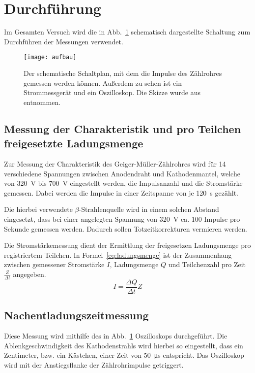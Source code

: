 
\newpage
\section{Durchführung}
%
Im Gesamten Versuch wird die in Abb.~\ref{fig:aufbau} schematisch 
dargestellte Schaltung zum Durchführen der Messungen verwendet.
%
\begin{figure}[h]
  \centering
  \texttt{[image: aufbau]}
  \caption{Der schematische Schaltplan, mit dem die Impulse
               des Zählrohres gemessen werden können. Außerdem zu sehen 
                ist ein Strommessgerät und ein Oszilloskop.
                 Die Skizze wurde aus \textcite{v703} entnommen.}
  \label{fig:aufbau}
\end{figure}
%
\subsection{Messung der Charakteristik und pro Teilchen freigesetzte Ladungsmenge}
%
Zur Messung der Charakteristik des Geiger-Müller-Zählrohres wird für 
\num{14} verschiedene Spannungen zwischen Anodendraht und 
Kathodenmantel, welche von \SI{320}{\volt} bis \SI{700}{\volt} 
eingestellt werden, die Impulsanzahl und die Stromstärke gemessen. 
Dabei werden die Impulse in einer Zeitspanne von je \SI{120}{\second} 
gezählt.

Die hierbei verwendete $\beta$-Strahlenquelle wird in einem solchen Abstand eingesetzt, 
dass bei einer angelegten Spannung von \SI{320}{\volt} ca. \num{100} Impulse pro 
Sekunde gemessen werden. Dadurch sollen Totzeitkorrekturen vermieren werden.

Die Stromstärkemessung dient der Ermittlung der freigesetzen 
Ladungsmenge pro registriertem Teilchen. In Formel~\eqref{eq:ladungsmenge} 
ist der Zusammenhang zwischen gemessener Stromstärke $I$, Ladungsmenge $Q$ 
und Teilchenzahl pro Zeit $\frac{Z}{\Delta t}$ angegeben.
\begin{equation}
I = \frac{\Delta Q}{\Delta t} Z
\label{eq:ladungsmenge}
\end{equation}
%
\subsection{Nachentladungszeitmessung}
%
Diese Messung wird mithilfe des in Abb.~\ref{fig:aufbau} Oszilloskops 
durchgeführt. Die Ablenkgeschwindigkeit des Kathodenstrahls wird hierbei 
so eingestellt, dass ein Zentimeter, bzw. ein Kästchen, einer Zeit von \SI{50}{\micro\second} 
entspricht. Das Oszilloskop wird mit der Anstiegsflanke der Zählrohrimpulse getriggert.

